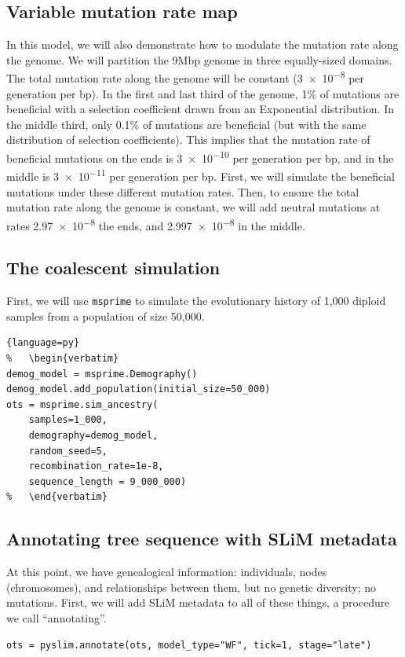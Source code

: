 \documentclass[12pt]{article}
\newcommand{\msprime}[0]{\texttt{msprime}\xspace}
\begin{document}
\subsection*{Variable mutation rate map}

In this model, we will also demonstrate how to modulate the mutation rate along the genome.
We will partition the 9Mbp genome in three equally-sized domains.
The total mutation rate along the genome will be constant (\num{3e-8} per generation per bp).
In the first and last third of the genome, 1\% of mutations are beneficial with a selection coefficient drawn from an Exponential distribution.
In the middle third, only 0.1\% of mutations are beneficial (but with the same distribution of selection coefficients).
This implies that the mutation rate of beneficial mutations on the ends is \num{3e-10} per generation per bp, and in the middle is \num{3e-11} per generation per bp.
First, we will simulate the beneficial mutations under these different mutation rates.
Then, to ensure the total mutation rate along the genome is constant, we will add neutral mutations at rates \num{2.97e-8} the ends, and \num{2.997e-8} in the middle.


 \subsection*{The coalescent simulation}

 First, we will use \msprime to simulate the evolutionary history of 1,000 diploid samples from a population of size 50,000.

\begin{lstlisting}{language=py}
%   \begin{verbatim}
demog_model = msprime.Demography()
demog_model.add_population(initial_size=50_000)
ots = msprime.sim_ancestry(
    samples=1_000,
    demography=demog_model,
    random_seed=5,
    recombination_rate=1e-8,
    sequence_length = 9_000_000)
%   \end{verbatim}
\end{lstlisting}

\subsection*{Annotating tree sequence with SLiM metadata}

At this point, we have genealogical information: individuals, nodes (chromosomes), and relationships between them,
but no genetic diversity; no mutations. 
First, we will add SLiM metadata to all of these things, a procedure we call “annotating”.
\begin{listing}[H]
  \begin{verbatim}
ots = pyslim.annotate(ots, model_type="WF", tick=1, stage="late")
  \end{verbatim}
\end{listing}
\end{document}
